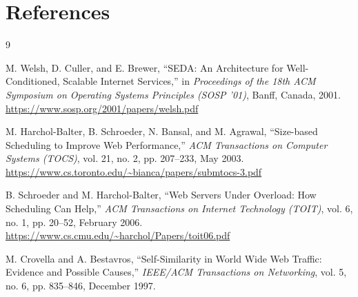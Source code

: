 \documentclass[11pt,a4paper]{article}
\begin{document}
\section*{References}

\begin{thebibliography}{9}

M. Welsh, D. Culler, and E. Brewer,
``SEDA: An Architecture for Well-Conditioned, Scalable Internet Services,''
in \textit{Proceedings of the 18th ACM Symposium on Operating Systems Principles (SOSP '01)},
Banff, Canada, 2001.
\url{https://www.sosp.org/2001/papers/welsh.pdf}

M. Harchol-Balter, B. Schroeder, N. Bansal, and M. Agrawal,
``Size-based Scheduling to Improve Web Performance,''
\textit{ACM Transactions on Computer Systems (TOCS)},
vol. 21, no. 2, pp. 207--233, May 2003.
\url{https://www.cs.toronto.edu/~bianca/papers/submtocs-3.pdf}

B. Schroeder and M. Harchol-Balter,
``Web Servers Under Overload: How Scheduling Can Help,''
\textit{ACM Transactions on Internet Technology (TOIT)},
vol. 6, no. 1, pp. 20--52, February 2006.
\url{https://www.cs.cmu.edu/~harchol/Papers/toit06.pdf}

M. Crovella and A. Bestavros,
``Self-Similarity in World Wide Web Traffic: Evidence and Possible Causes,''
\textit{IEEE/ACM Transactions on Networking},
vol. 5, no. 6, pp. 835--846, December 1997.

\end{thebibliography}
\end{document}
